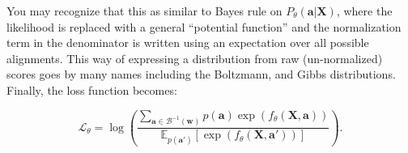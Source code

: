 You may recognize that this as similar to Bayes rule on $P_{\theta}(\mathbf{a}|\mathbf{X})$, where the likelihood is replaced with a general ``potential function'' and the normalization term in the denominator is written using an expectation over all possible alignments. This way of expressing a distribution from raw (un-normalized) scores goes by many names including the Boltzmann, and Gibbs distributions. Finally, the loss function becomes:

\begin{equation}
\label{eq:loss}
    \mathcal{L}_{\theta} = \log \left( \frac{\sum_{\mathbf{a}\in \mathcal{B}^{-1}(\mathbf{w})} p(\mathbf{a})\exp(f_{\theta}(\mathbf{X},\mathbf{a}))}{\mathbb{E}_{p(\mathbf{a'})}[\exp(f_{\theta}(\mathbf{X},\mathbf{a'}))]} \right).
\end{equation}
